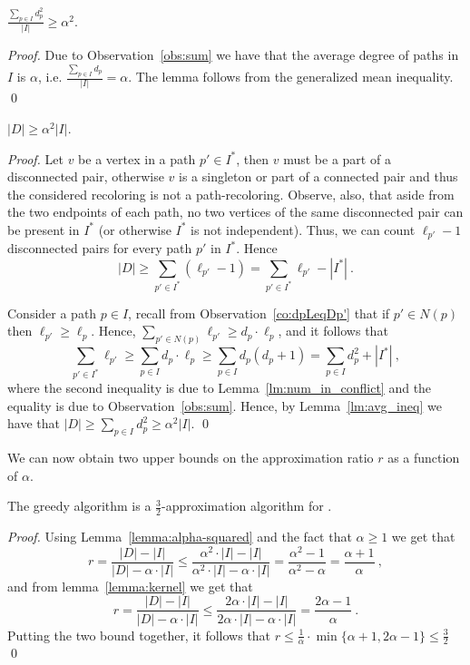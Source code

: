 \begin{lemma}
\label{lm:avg_ineq}
$\frac{\sum_{p \in I}{d_p^2}}{|I|} \geq \alpha^2$.
\end{lemma}
\begin{proof}
Due to Observation~\ref{obs:sum} we have that the average degree of
paths in $I$ is $\alpha$, i.e. $\frac{\sum_{p \in I}{d_p}}{|I|}
= \alpha$.  The lemma follows from the generalized mean inequality.
\qed{}\end{proof}


\begin{lemma}
\label{lemma:alpha-squared}
$|D| \geq \alpha^2|I|$.
\end{lemma}
\begin{proof}
Let $v$ be a vertex in a path $p' \in I^*$, then $v$ must be a part of
a disconnected pair, otherwise $v$ is a singleton or part of a
connected pair and thus the considered recoloring is not a
path-recoloring.  Observe, also, that aside from the two endpoints of
each path, no two vertices of the same disconnected pair can be
present in $I^*$ (or otherwise $I^*$ is not independent).  Thus, we
can count $\ell_{p'} - 1$ disconnected pairs for every path $p'$ in
$I^*$.  Hence
\[
|D| \geq \sum_{p' \in I^*} (\ell_{p'} - 1) = \sum_{p' \in I^*}{\ell_{p'}} -
|I^*| ~.
\]

Consider a path $p \in I$, 
recall from Observation~\ref{co:dpLeqDp'} that if $p' \in N(p)$ 
then $\ell_{p'} \geq \ell_p$.
%
Hence, 
$\sum_{p' \in N(p)}{\ell_{p'}} \geq d_p \cdot \ell_p$, 
and it follows that
\[
\sum_{p' \in I^*} \ell_{p'}
\geq \sum_{p \in I} d_p \cdot \ell_p
\geq \sum_{p \in I} d_p(d_p+1)
=    \sum_{p \in I} d_p^2 + |I^*|
~,
\]
where the second inequality is due to Lemma~\ref{lm:num_in_conflict}
and the equality is due to Observation~\ref{obs:sum}.
Hence, by Lemma~\ref{lm:avg_ineq} we have that
\(
|D| \geq \sum_{p \in I} d_p^2 \geq \alpha^2 |I|
\).
\qed{}\end{proof}

We can now obtain two upper bounds on the approximation ratio $r$ as a
function of $\alpha$.

\begin{theorem}
The greedy algorithm is a $\frac{3}{2}$-approximation algorithm for
\TWOCR{}.
\end{theorem}
\begin{proof}
Using Lemma~\ref{lemma:alpha-squared} and the fact that $\alpha \geq 1$ we get
that
$$
r
=    \frac{|D| - |I|}{|D| - \alpha \cdot |I|}
\leq \frac{\alpha ^ 2 \cdot |I| - |I|}{\alpha ^ 2 \cdot |I| - \alpha \cdot |I|}
=    \frac{\alpha ^ 2 - 1}{\alpha ^ 2 - \alpha}
=    \frac{\alpha+1}{\alpha}
~, 
$$
and from lemma~\ref{lemma:kernel} we get that
$$
r
=    \frac{|D| - |I|}{|D| - \alpha \cdot |I|}
\leq \frac{2 \alpha \cdot |I| - |I|}{2 \alpha \cdot |I| - \alpha \cdot |I|}
=    \frac{2 \alpha - 1}{\alpha}
~.
$$
Putting the two bound together, it follows that
\(
r
\leq \frac{1}{\alpha} \cdot \min\{\alpha+1,2\alpha-1\}
\leq    \frac{3}{2}
\)\qed{}
\end{proof}



